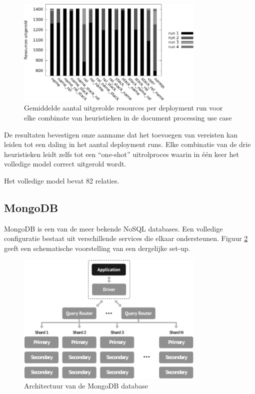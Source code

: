 \begin{figure}[h]
    \begin{center}
    \includegraphics[width=0.8\textwidth]{images/time_runs_doc.pdf}
    \caption{Gemiddelde aantal uitgerolde resources per deployment run voor elke combinate van heuristieken in de document processing use case}
    \label{fig:time_runs_doc}
    \end{center}
\end{figure}

De resultaten bevestigen onze aanname dat het toevoegen van vereisten kan leiden tot een daling in het aantal deployment runs.
Elke combinatie van de drie heuristieken leidt zelfs tot een ``one-shot'' uitrolproces waarin in \'e\'en keer het volledige model correct uitgerold wordt.

Het volledige model bevat 82 relaties. 
\subsection{MongoDB}
MongoDB is een van de meer bekende NoSQL databases.
Een volledige configuratie bestaat uit verschillende services die elkaar ondersteunen.
Figuur \ref{fig:mongodb_architecture} geeft een schematische voorstelling van een dergelijke set-up. 

\begin{figure}[h]
    \begin{center}
    \includegraphics[width=0.8\textwidth]{images/mongodb_architecture.pdf}
    \caption{Architectuur van de MongoDB database}
    \label{fig:mongodb_architecture}
    \end{center}
\end{figure}

